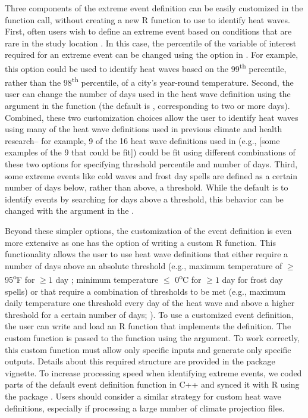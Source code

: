 Three components of the extreme event definition can be easily
customized in the  function call, without creating a
new R function to use to identify heat waves. First, often users wish to
define an extreme event based on conditions that are rare in the study
location \citep{IPCCch1}. In this case, the percentile of the variable
of interest required for an extreme event can be changed using the
 option in . For example, this
option could be used to identify heat waves based on the
99\textsuperscript{th} percentile, rather than the
98\textsuperscript{th} percentile, of a city's year-round temperature.
Second, the user can change the number of days used in the heat wave
definition using the  argument in the 
function (the default is , corresponding to two or
more days). Combined, these two customization choices allow the user to
identify heat waves using many of the heat wave definitions used in
previous climate and health research-- for example, 9 of the 16 heat
wave definitions used in \citet{kent2014heat} (e.g., {[}some examples of
the 9 that could be fit{]}) could be fit using different combinations of
these two options for specifying threshold percentile and number of
days. Third, some extreme events like cold waves and frost day spells
are defined as a certain number of days below, rather than above, a
threshold. While the default is to identify events by searching for days
above a threshold, this behavior can be changed with the
 argument in the
.

Beyond these simpler options, the customization of the event definition
is even more extensive as one has the option of writing a custom R
function. This functionality allows the user to use heat wave
definitions that either require a number of days above an absolute
threshold (e.g., maximum temperature of \(\ge\) 95\textsuperscript{o}F
for \(\ge1\) day \citet{kent2014heat, tan2007heat}; minimum temperature
\(\le\) 0\textsuperscript{o}C for \(\ge1\) day for frost day spells) or
that require a combination of thresholds to be met (e.g., maximum daily
temperature one threshold every day of the heat wave and above a higher
threshold for a certain number of days;
\citet{kent2014heat, peng2011toward}). To use a customized event
definition, the user can write and load an R function that implements
the definition. The custom function is passed to the 
function using the  argument. To work
correctly, this custom function must allow only specific inputs and
generate only specific outputs. Details about this required structure
are provided in the  package vignette. To increase
processing speed when identifying extreme events, we coded parts of the
default event definition function in C++ and synced it with R using the
 package \citep{Rcpp}. Users should consider a similar
strategy for custom heat wave definitions, especially if processing a
large number of climate projection files.


